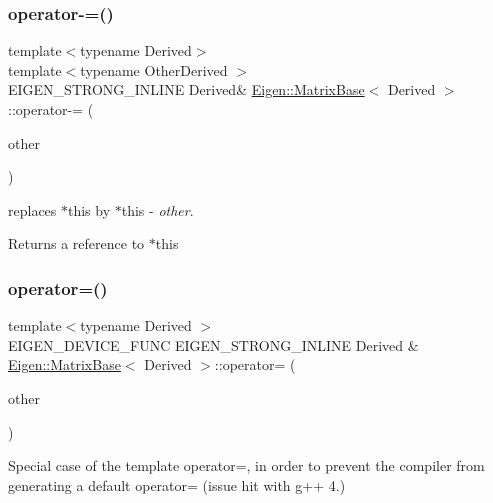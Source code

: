 \subsubsection{\texorpdfstring{operator-\/=()}{operator-=()}}
{\footnotesize\ttfamily template$<$typename Derived$>$ \\
template$<$typename Other\+Derived $>$ \\
E\+I\+G\+E\+N\+\_\+\+S\+T\+R\+O\+N\+G\+\_\+\+I\+N\+L\+I\+NE Derived\& \mbox{\hyperlink{class_eigen_1_1_matrix_base}{Eigen\+::\+Matrix\+Base}}$<$ Derived $>$\+::operator-\/= (\begin{DoxyParamCaption}\item[{const \mbox{\hyperlink{class_eigen_1_1_matrix_base}{Matrix\+Base}}$<$ Other\+Derived $>$ \&}]{other }\end{DoxyParamCaption})}

replaces {\ttfamily $\ast$this} by {\ttfamily $\ast$this} -\/ {\itshape other}.

\begin{DoxyReturn}{Returns}
a reference to {\ttfamily $\ast$this} 
\end{DoxyReturn}
\mbox{\label{class_eigen_1_1_matrix_base_a706a4dd1ee54786e9210de1a4bf02600}} 
\subsubsection{\texorpdfstring{operator=()}{operator=()}}
{\footnotesize\ttfamily template$<$typename Derived $>$ \\
E\+I\+G\+E\+N\+\_\+\+D\+E\+V\+I\+C\+E\+\_\+\+F\+U\+NC E\+I\+G\+E\+N\+\_\+\+S\+T\+R\+O\+N\+G\+\_\+\+I\+N\+L\+I\+NE Derived \& \mbox{\hyperlink{class_eigen_1_1_matrix_base}{Eigen\+::\+Matrix\+Base}}$<$ Derived $>$\+::operator= (\begin{DoxyParamCaption}\item[{const \mbox{\hyperlink{class_eigen_1_1_matrix_base}{Matrix\+Base}}$<$ Derived $>$ \&}]{other }\end{DoxyParamCaption})}

Special case of the template operator=, in order to prevent the compiler from generating a default operator= (issue hit with g++ 4.) \mbox{\label{class_eigen_1_1_matrix_base_a0f555511cb0f8ccbbb0e6c597c4cf412}} 
